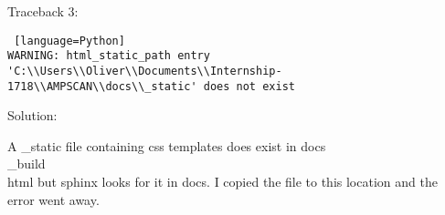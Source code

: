 \documentclass{article}
\begin{document}
Traceback 3:

\begin{lstlisting} [language=Python]
WARNING: html_static_path entry 'C:\\Users\\Oliver\\Documents\\Internship-1718\\AMPSCAN\\docs\\_static' does not exist
\end{lstlisting}

Solution:

A \_static file containing css templates does exist in docs\\\_build\\html but sphinx looks for it in docs. I copied the file to this location and the error went away.
\end{document}
